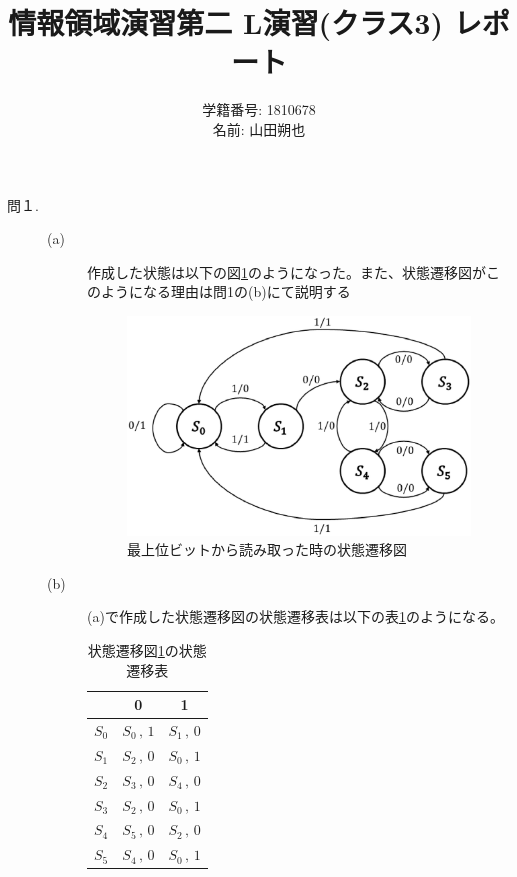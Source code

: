 \documentclass{jsarticle}
\title{情報領域演習第二 L演習(クラス3) レポート}
\author{学籍番号: 1810678 \\
        名前: 山田朔也}
\begin{document}
    \maketitle
    \begin{description}
        \item[問１.]
        \begin{description}
            \item[(a)]
            作成した状態は以下の図\ref{fig1}のようになった。また、状態遷移図がこのようになる理由は問1の(b)にて説明する
            \begin{figure}[H]
                \centering
                \includegraphics[width = 10cm]{fig_1.eps}
                \caption{最上位ビットから読み取った時の状態遷移図}
                \label{fig1}
            \end{figure}

            \item[(b)]
            (a)で作成した状態遷移図の状態遷移表は以下の表\ref{tab1}のようになる。
            \begin{table}[H]
                \centering
                \caption{状態遷移図\ref{fig1}の状態遷移表}
                \label{tab1}
                \begin{tabular}{|c|c|c|} \hline
                    & 0 & 1 \\ \hline
                    $S_0$ & $S_0 \,,\, 1$ & $S_1 \,,\, 0$ \\ \hline
                    $S_1$ & $S_2 \,,\, 0$ & $S_0 \,,\, 1$ \\ \hline
                    $S_2$ & $S_3 \,,\, 0$ & $S_4 \,,\, 0$ \\ \hline
                    $S_3$ & $S_2 \,,\, 0$ & $S_0 \,,\, 1$ \\ \hline
                    $S_4$ & $S_5 \,,\, 0$ & $S_2 \,,\, 0$ \\ \hline
                    $S_5$ & $S_4 \,,\, 0$ & $S_0 \,,\, 1$ \\ \hline
                \end{tabular}
            \end{table}


\end{description}
\end{description}
\end{document}
